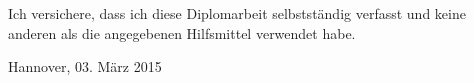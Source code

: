 

%


\noindent Ich versichere, dass ich diese Diplomarbeit selbstständig
verfasst und keine anderen als die angegebenen Hilfsmittel verwendet
habe.

\vspace{25mm}

\noindent Hannover, 03. März 2015
\newpage

